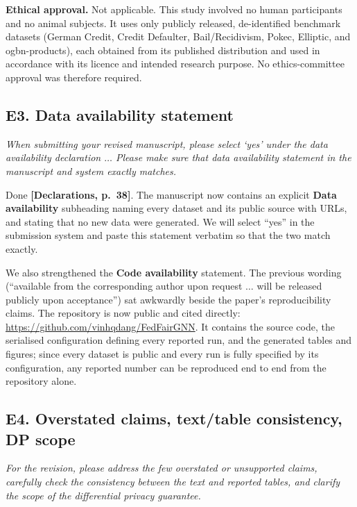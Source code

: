 \documentclass[11pt,a4paper]{article}
\newenvironment{comment}
  {\begin{mdframed}[backgroundcolor=quotegray,linewidth=0pt,skipabove=8pt,
    skipbelow=6pt,innertopmargin=6pt,innerbottommargin=6pt]\itshape}
  {\end{mdframed}}
\newenvironment{newtextbox}
  {\begin{mdframed}[linecolor=newtext!45,linewidth=0.8pt,skipabove=6pt,
    skipbelow=8pt,innertopmargin=6pt,innerbottommargin=6pt]\small}
  {\end{mdframed}}
\newcommand{\where}[1]{\textcolor{revblue}{\textbf{[#1]}}}
\begin{document}
\begin{newtextbox}
\textbf{Ethical approval.} Not applicable. This study involved no human
participants and no animal subjects. It uses only publicly released,
de-identified benchmark datasets (German Credit, Credit Defaulter,
Bail/Recidivism, Pokec, Elliptic, and ogbn-products), each obtained from its
published distribution and used in accordance with its licence and intended
research purpose. No ethics-committee approval was therefore required.
\end{newtextbox}

\subsection*{E3. Data availability statement}

\begin{comment}
When submitting your revised manuscript, please select `yes' under the data
availability declaration $\dots$ Please make sure that data availability
statement in the manuscript and system exactly matches.
\end{comment}

Done \where{Declarations, p.~38}. The manuscript now contains an explicit
\textbf{Data availability} subheading naming every dataset and its public
source with URLs, and stating that no new data were generated. We will select
``yes'' in the submission system and paste this statement verbatim so that the
two match exactly.

We also strengthened the \textbf{Code availability} statement. The previous
wording (``available from the corresponding author upon request $\dots$ will be
released publicly upon acceptance'') sat awkwardly beside the paper's
reproducibility claims. The repository is now public and cited directly:
\url{https://github.com/vinhqdang/FedFairGNN}. It contains the source code, the
serialised configuration defining every reported run, and the generated tables
and figures; since every dataset is public and every run is fully specified by
its configuration, any reported number can be reproduced end to end from the
repository alone.

\subsection*{E4. Overstated claims, text/table consistency, DP scope}

\begin{comment}
For the revision, please address the few overstated or unsupported claims,
carefully check the consistency between the text and reported tables, and
clarify the scope of the differential privacy guarantee.
\end{comment}
\end{document}
